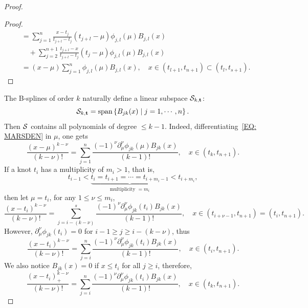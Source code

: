 \begin{proof}
\begin{proof}
\begin{equation}
\begin{aligned}
            &=  \sum_{j=1}^n  \frac{x - t_j}{t_{j+l} - t_j}(t_{j+l}-\mu) \phi_{j,l}(\mu) B_{j, l}(x) \\&\quad +  \sum_{j=2}^{n+1} \frac{t_{j+l} - x}{t_{j+l} - t_{j}} (t_{j}-\mu)\phi_{j, l}(\mu)  B_{j, l}(x)\\
            &=  (x - \mu)  \sum_{j=1}^n\phi_{j,l}(\mu) B_{j, l}(x),\quad x\in (t_{l+1}, t_{n+1})\subset (t_{l}, t_{s+1}). 
        \end{aligned}
        \end{equation}
    \end{proof}
    The B-splines of order $k$ naturally define a linear subspace $\mathcal S_{k,\mathbf t}$:
    \begin{equation}
        \mathcal S_{k,\mathbf t} = \text{span} \left\{ B_{jk}(x) \mid j=1,\cdots, n\right\}.
    \end{equation}
    Then $\mathcal S$ contains all polynomials of degree $\le k-1$. Indeed, differentiating~\eqref{EQ: MARSDEN} in $\mu$, one gets
    \begin{equation}
        \frac{(x - \mu)^{k - \nu}}{(k - \nu)!} = \sum_{j=1}^n\frac{(-1)^{\nu}\partial_{\mu}^{\nu} \phi_{jk}(\mu) B_{jk}(x)}{(k-1)!}, \quad x\in (t_{k}, t_{n+1}). 
    \end{equation}
    If a knot $t_i$ has a multiplicity of $m_i > 1$, that is, 
    $$t_{i-1} < \underbrace{t_i = t_{i+1} = \cdots = t_{i + m_{i} - 1} }_{\text{multiplicity } = m_i}< t_{i + m_i}, $$
    then let $\mu = t_i$, for any $1\le \nu \le m_i$, 
    \begin{equation}
        \frac{(x - t_i)^{k - \nu}}{(k - \nu)!} = \sum_{j= i - ( k -\nu)}^s \frac{(-1)^{\nu}\partial_{\mu}^{\nu} \phi_{jk}(t_i) B_{jk}(x)}{(k-1)!}, \quad x\in (t_{i + \nu-1}, t_{n+1}) = (t_i, t_{n+1}). 
    \end{equation}
    However, $\partial_{\mu}^{\nu} \phi_{jk}(t_i) = 0$ for $i-1 \ge j \ge i - (k-\nu)$, thus 
    \begin{equation}
         \frac{(x - t_i)^{k - \nu}}{(k - \nu)!} = \sum_{j= i}^n \frac{(-1)^{\nu}\partial_{\mu}^{\nu} \phi_{jk}(t_i) B_{jk}(x)}{(k-1)!}, \quad x\in (t_i, t_{n+1}). 
    \end{equation}
    We also notice $B_{jk}(x) = 0$ if $x\le t_i$ for all $j\ge i$, therefore, 
    \begin{equation}
        \frac{(x - t_i)^{k - \nu}_{+}}{(k - \nu)!} = \sum_{j= i}^n \frac{(-1)^{\nu}\partial_{\mu}^{\nu} \phi_{jk}(t_i) B_{jk}(x)}{(k-1)!}, \quad x\in (t_{k}, t_{n+1}).
    \end{equation}
    \end{proof}
